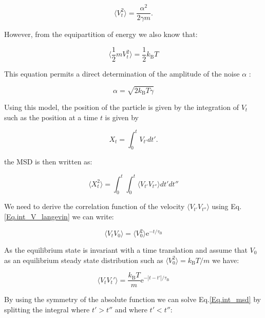 \begin{equation}
	\langle V_t ^2\rangle = \frac{\alpha ^2}{2 \gamma m}.
\end{equation}

However, from the equipartition of energy we also know that:

\begin{equation}
	\langle \frac{1}{2} m V_t ^2 \rangle  = \frac{1}{2} k_\mathrm{B} T
\end{equation}

This equation permits a direct determination of the amplitude of the noise $\alpha$ : 

\begin{equation}
	\alpha = \sqrt{2k_\mathrm{B}T \gamma}
\end{equation}

Using this model, the position of the particle is given by the integration of $V_t$ such as the position at a time $t$ is given by

\begin{equation}
	X_t = \int _0 ^t V_{t'}dt'.
\end{equation}

the \gls{MSD} is then written as:

\begin{equation}
	\langle X_t ^ 2 \rangle  = \int _0 ^ {t} \int _0 ^{t} \langle V_{t'}V_{t''} \rangle dt'dt''
	\label{Eq.int_msd}
\end{equation}

We need to derive the correlation function of the velocity $ \langle V_{t'}V_{t''} \rangle $ using Eq.\ref{Eq.int_V_langevin} we can write:

\begin{equation}
	\langle V_t V_0 \rangle = \langle V_0 ^2 \rangle \mathrm{e}^{-t/\tau_{\mathrm{B}}}
\end{equation}

As the equilibrium state is invariant with a time translation and assume that $V_0$ as an equilibrium steady state distribution such as $\langle V_0^2 \rangle = k_\mathrm{B} T / m$ we have:

\begin{equation}
	\langle V_t V_t' \rangle = \frac{k_\mathrm{B}T}{m} \mathrm{e}^{-|t-t'|/\tau_{\mathrm{B}}}
\end{equation}

By using the symmetry of the absolute function we can solve Eq.\ref{Eq.int_msd} by splitting the integral where $t'>t''$ and where $ t' < t''$:

